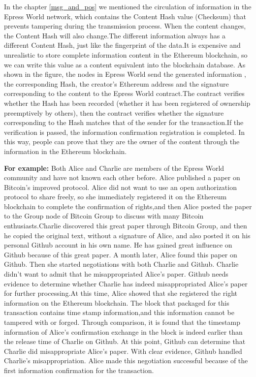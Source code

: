 \documentclass{article}
\begin{document}
    In the chapter \ref{msg_and_pos} we mentioned the circulation of information in the Epress World network, which contains the Content Hash value (Checksum) that prevents tampering during the transmission process. When the content changes, the Content Hash will also change.The different information always has a different Content Hash, just like the fingerprint of the data.It is expensive and unrealistic to store complete information content in the Ethereum blockchain, so we can write this value as a content equivalent into the blockchain database.
    As shown in the figure, the nodes in Epress World send the generated information , the corresponding Hash, the creator's Ethereum address and the signature corresponding to the content to the Epress World contract.The contract verifies whether the Hash has been recorded (whether it has been registered of ownership preemptively by others), then the contract verifies whether the signature corresponding to the Hash matches that of the sender for the transaction.If the verification is passed, the information confirmation registration is completed. In this way, people can prove that they are the owner of the content through the information in the Ethereum blockchain.
    ~\newline
    \begin{blockqt}
    \textbf{For example: }Both Alice and Charlie are members of the Epress World community and have not known each other before. Alice published a paper on Bitcoin's improved protocol. Alice did not want to use an open authorization protocol to share freely, so she immediately registered it on the Ethereum blockchain to complete the confirmation of rights,and then Alice posted the paper to the Group node of Bitcoin Group to discuss with many Bitcoin enthusiasts.Charlie discovered this great paper through Bitcoin Group, and then he copied the original text, without a signature of Alice, and also posted it on his personal Github account in his own name. He has gained great influence on Github because of this great paper. A month later, Alice found this paper on Github. Then she started negotiations with both Charlie and Github. Charlie didn't want to admit that he misappropriated Alice's paper. Github needs evidence to determine whether Charlie has indeed misappropriated Alice's paper for further processing.At this time, Alice showed that she registered the right information on the Ethereum blockchain. The block that packaged for this transaction contains time stamp information,and this information cannot be tampered with or forged. Through comparison, it is found that the timestamp information of Alice's confirmation exchange in the block is indeed earlier than the release time of Charlie on Github. At this point, Github can determine that Charlie did misappropriate Alice's paper. With clear evidence, Github handled Charlie's misappropriation. Alice made this negotiation successful because of the first information confirmation for the transaction.
    \end{blockqt}
\end{document}
